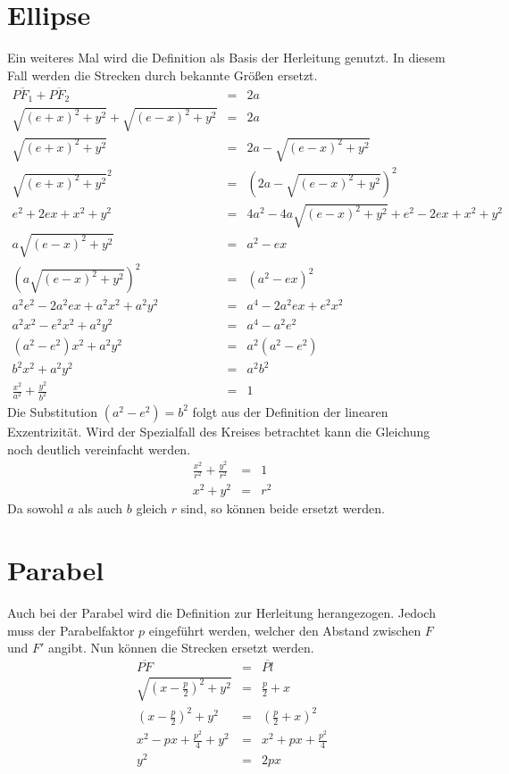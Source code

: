 \section{Ellipse}
Ein weiteres Mal wird die Definition als Basis der Herleitung \cite[S.11]{Scheid:1985} genutzt. In diesem Fall werden die Strecken durch bekannte Größen ersetzt.
\begin{displaymath}
	\begin{array}{rcl}
		\overline{{PF}_1} + \overline{{PF}_2} & = & 2a\\
		\sqrt{{(e+x)}^2 + y^2} + \sqrt{{(e-x)}^2 + y^2} & = & 2a\\
		\sqrt{{(e+x)}^2 + y^2} & = & 2a - \sqrt{{(e-x)}^2 + y^2}\\
		\sqrt{{(e+x)}^2 + y^2}^2 & = & \left (2a - \sqrt{{(e-x)}^2 + y^2}\right )^2\\
		e^2 + 2ex + x^2 + y^2 & = & 4a^2 - 4a \sqrt{(e-x)^2+y^2} + e^2 - 2ex + x^2 + y^2\\
		a\sqrt{{(e-x)}^2 + y^2} & = & a^2 - ex\\
		\left (a\sqrt{{(e-x)}^2 + y^2}\right )^2 & = & \left(a^2 - ex\right)^2\\
		a^2e^2 - 2a^2ex + a^2x^2 + a^2y^2 &=& a^4 - 2a^2ex + e^2x^2\\
		a^2x^2 - e^2x^2 + a^2y^2 &=& a^4 - a^2e^2\\
		\left(a^2 - e^2\right)x^2 + a^2y^2 &=& a^2\left(a^2 - e^2\right)\\
		b^2x^2 + a^2y^2 &=& a^2b^2\\
		\frac{x^2}{a^2} + \frac{y^2}{b^2} &=& 1
	\end{array}
\end{displaymath}
Die Substitution $\left(a^2 - e^2\right) = b^2$ folgt aus der Definition der linearen Exzentrizität. Wird der Spezialfall des Kreises betrachtet kann die Gleichung noch deutlich vereinfacht werden.
\begin{displaymath}
	\begin{array}{rcl}
		\frac{x^2}{r^2} + \frac{y^2}{r^2} &=& 1\\
		x^2 + y^2 &=& r^2
	\end{array}
\end{displaymath}
Da sowohl $a$ als auch $b$ gleich $r$ sind, so können beide ersetzt werden. 
\section{Parabel}
Auch bei der Parabel wird die Definition zur Herleitung\cite[S.30f]{Scheid:1985} herangezogen. Jedoch muss der Parabelfaktor $p$ eingeführt werden, welcher den Abstand zwischen $F$ und $F'$ angibt. Nun können die Strecken ersetzt werden.
\begin{displaymath}
	\begin{array}{rcl}
		\overline{PF} &=& \overline{Pl}\\
		\sqrt{\left(x-\frac{p}{2}\right)^2+y^2} &=& \frac{p}{2} + x\\
		\left(x-\frac{p}{2}\right)^2+y^2 &=& \left(\frac{p}{2} + x\right)^2\\
		x^2 - px + \frac{p^2}{4} + y^2 &=& x^2 + px + \frac{p^2}{4}\\
		y^2 &=& 2px
	\end{array}
\end{displaymath}
